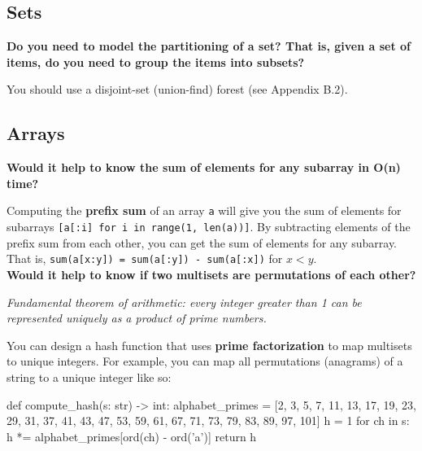 \documentclass[12pt]{article}
\begin{document}
\subsection*{Sets}

\begin{adjustwidth}{2em}{0pt}
\textbf{Do you need to model the partitioning of a set? That is, given a set of items, do you need to group the items into subsets?} \medskip

You should use a disjoint-set (union-find) forest (see Appendix B.2).
\end{adjustwidth}

\subsection*{Arrays}

\begin{adjustwidth}{2em}{0pt}
\textbf{Would it help to know the sum of elements for any subarray in O(n) time?} \medskip

Computing the \textbf{prefix sum} of an array \texttt{a} will give you the sum of elements for subarrays \texttt{[a[:i] for i in range(1, len(a))]}. By subtracting elements of the prefix sum from each other, you can get the sum of elements for any subarray. That is, \texttt{sum(a[x:y]) = sum(a[:y]) - sum(a[:x])} for $x < y$. \\

\textbf{Would it help to know if two multisets are permutations of each other?} \medskip

\textit{Fundamental theorem of arithmetic: every integer greater than 1 can be represented uniquely as a product of prime numbers.} \medskip

You can design a hash function that uses \textbf{prime factorization} to map multisets to unique integers. For example, you can map all permutations (anagrams) of a string to a unique integer like so: \medskip

\begin{python}
def compute_hash(s: str) -> int:
    alphabet_primes = [2, 3, 5, 7, 11, 13, 17, 19, 23, 29,
                       31, 37, 41, 43, 47, 53, 59, 61, 67,
                       71, 73, 79, 83, 89, 97, 101]
    h = 1
    for ch in s:
        h *= alphabet_primes[ord(ch) - ord('a')]
    return h
\end{python}


\end{adjustwidth}
\end{document}
